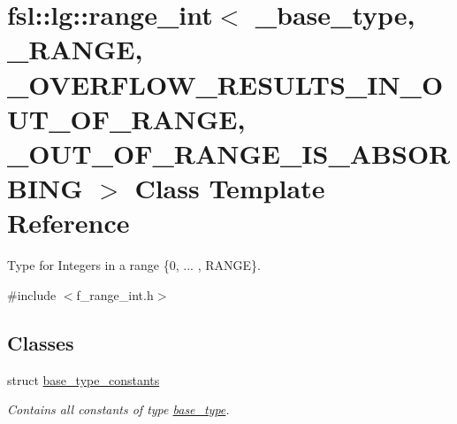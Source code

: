 \hypertarget{classfsl_1_1lg_1_1range__int}{}\section{fsl\+::lg\+::range\+\_\+int$<$ \+\_\+base\+\_\+type, \+\_\+\+R\+A\+N\+GE, \+\_\+\+O\+V\+E\+R\+F\+L\+O\+W\+\_\+\+R\+E\+S\+U\+L\+T\+S\+\_\+\+I\+N\+\_\+\+O\+U\+T\+\_\+\+O\+F\+\_\+\+R\+A\+N\+GE, \+\_\+\+O\+U\+T\+\_\+\+O\+F\+\_\+\+R\+A\+N\+G\+E\+\_\+\+I\+S\+\_\+\+A\+B\+S\+O\+R\+B\+I\+NG $>$ Class Template Reference}
\label{classfsl_1_1lg_1_1range__int}


Type for Integers in a range \{0, ... , R\+A\+N\+GE\}.  




{\ttfamily \#include $<$f\+\_\+range\+\_\+int.\+h$>$}

\subsection*{Classes}
\begin{DoxyCompactItemize}
\item 
struct \mbox{\hyperlink{structfsl_1_1lg_1_1range__int_1_1base__type__constants}{base\+\_\+type\+\_\+constants}}
\begin{DoxyCompactList}\small\item\em Contains all constants of type \mbox{\hyperlink{classfsl_1_1lg_1_1range__int_a4ce67cd216fd303b7bae83a7cbcab3bb}{base\+\_\+type}}. \end{DoxyCompactList}\end{DoxyCompactItemize}
